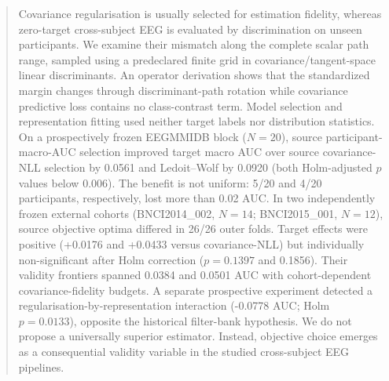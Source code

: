 \begin{abstract}
Covariance regularisation is usually selected for estimation fidelity,
whereas zero-target cross-subject EEG is evaluated by discrimination on
unseen participants. We examine their mismatch along the complete scalar path
range, sampled using a predeclared finite grid in covariance/tangent-space linear discriminants. An operator
derivation shows that the standardized margin changes through
discriminant-path rotation while covariance predictive loss contains no
class-contrast term. Model selection and representation fitting used
neither target labels nor distribution statistics. On a prospectively
frozen EEGMMIDB block (\(N=20\)), source participant-macro-AUC selection
improved target macro AUC over source covariance-NLL selection by 0.0561
and Ledoit--Wolf by 0.0920 (both Holm-adjusted \(p\) values below 0.006).
The benefit is not uniform: 5/20 and 4/20 participants, respectively,
lost more than 0.02 AUC. In two independently frozen external cohorts
(BNCI2014\_002, \(N=14\); BNCI2015\_001, \(N=12\)), source objective
optima differed in 26/26 outer folds. Target effects were positive
(+0.0176 and +0.0433 versus covariance-NLL) but individually
non-significant after Holm correction (\(p=0.1397\) and 0.1856).
Their validity frontiers spanned 0.0384 and 0.0501 AUC with
cohort-dependent covariance-fidelity budgets. A separate prospective
experiment detected a regularisation-by-representation interaction
(-0.0778 AUC; Holm \(p=0.0133\)), opposite the historical filter-bank
hypothesis. We do not propose a universally superior estimator.
Instead, objective choice emerges as a consequential validity variable
in the studied cross-subject EEG pipelines.
\end{abstract}
